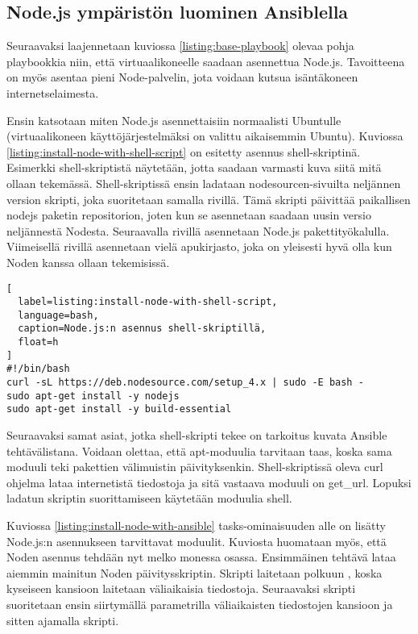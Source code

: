 \subsection{Node.js ympäristön luominen Ansiblella}

Seuraavaksi laajennetaan kuviossa \ref{listing:base-playbook} olevaa pohja playbookkia niin, että virtuaalikoneelle saadaan asennettua Node.js. Tavoitteena on myös asentaa pieni Node-palvelin, jota voidaan kutsua isäntäkoneen internetselaimesta.

Ensin katsotaan miten Node.js asennettaisiin normaalisti Ubuntulle (virtuaalikoneen käyttöjärjestelmäksi on valittu aikaisemmin Ubuntu). Kuviossa \ref{listing:install-node-with-shell-script} on esitetty asennus shell-skriptinä. Esimerkki shell-skriptistä näytetään, jotta saadaan varmasti kuva siitä mitä ollaan tekemässä. Shell-skriptissä ensin ladataan nodesourcen-sivuilta neljännen version skripti, joka suoritetaan samalla rivillä. Tämä skripti päivittää paikallisen nodejs paketin repositorion, joten kun se asennetaan saadaan uusin versio neljännestä Nodesta. Seuraavalla rivillä asennetaan Node.js pakettityökalulla. Viimeisellä rivillä asennetaan vielä apukirjasto, joka on yleisesti hyvä olla kun Noden kanssa ollaan tekemisissä.

\begin{lstlisting}[
  label=listing:install-node-with-shell-script,
  language=bash,
  caption=Node.js:n asennus shell-skriptillä,
  float=h
]
#!/bin/bash
curl -sL https://deb.nodesource.com/setup_4.x | sudo -E bash -
sudo apt-get install -y nodejs
sudo apt-get install -y build-essential
\end{lstlisting}

Seuraavaksi samat asiat, jotka shell-skripti tekee on tarkoitus kuvata Ansible tehtävälistana. Voidaan olettaa, että apt-moduulia tarvitaan taas, koska sama moduuli teki pakettien välimuistin päivityksenkin. Shell-skriptissä oleva curl ohjelma lataa internetistä tiedostoja ja sitä vastaava moduuli on get\_url. Lopuksi ladatun skriptin suorittamiseen käytetään moduulia shell.

Kuviossa \ref{listing:install-node-with-ansible} tasks-ominaisuuden alle on lisätty Node.js:n asennukseen tarvittavat moduulit. Kuviosta huomataan myös, että Noden asennus tehdään nyt melko monessa osassa. Ensimmäinen tehtävä lataa aiemmin mainitun Noden päivitysskriptin. Skripti laitetaan polkuun , koska kyseiseen kansioon laitetaan väliaikaisia tiedostoja. Seuraavaksi skripti suoritetaan ensin siirtymällä parametrilla  väliaikaisten tiedostojen kansioon ja sitten ajamalla skripti.

